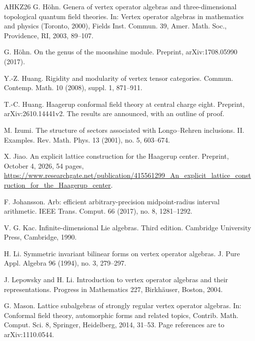 \documentclass[leqno]{article}
\numberwithin{equation}{section}
\begin{document}
\begin{thebibliography}{AHKZ26}
G. Höhn.
\newblock Genera of vertex operator algebras and three-dimensional topological quantum field theories.
\newblock In: Vertex operator algebras in mathematics and physics (Toronto, 2000), Fields Inst. Commun. 39, Amer. Math. Soc., Providence, RI, 2003, 89--107.

G. Höhn.
\newblock On the genus of the moonshine module.
\newblock Preprint, arXiv:1708.05990 (2017).

Y.-Z. Huang.
\newblock Rigidity and modularity of vertex tensor categories.
\newblock Commun. Contemp. Math. 10 (2008), suppl. 1, 871--911.

T.-C. Huang.
\newblock Haagerup conformal field theory at central charge eight.
\newblock Preprint, arXiv:2610.14441v2. The results are announced, with an outline of proof.

M. Izumi.
\newblock The structure of sectors associated with Longo--Rehren inclusions. II. Examples.
\newblock Rev. Math. Phys. 13 (2001), no. 5, 603--674.

X. Jiao.
\newblock An explicit lattice construction for the Haagerup center.
\newblock Preprint, October 4, 2026, 54 pages, \url{https://www.researchgate.net/publication/415561299_An_explicit_lattice_construction_for_the_Haagerup_center}.

F. Johansson.
\newblock Arb: efficient arbitrary-precision midpoint-radius interval arithmetic.
\newblock IEEE Trans. Comput. 66 (2017), no. 8, 1281--1292.

V. G. Kac.
\newblock Infinite-dimensional Lie algebras. Third edition.
\newblock Cambridge University Press, Cambridge, 1990.

H. Li.
\newblock Symmetric invariant bilinear forms on vertex operator algebras.
\newblock J. Pure Appl. Algebra 96 (1994), no. 3, 279--297.

J. Lepowsky and H. Li.
\newblock Introduction to vertex operator algebras and their representations.
\newblock Progress in Mathematics 227, Birkhäuser, Boston, 2004.

G. Mason.
\newblock Lattice subalgebras of strongly regular vertex operator algebras.
\newblock In: Conformal field theory, automorphic forms and related topics, Contrib. Math. Comput. Sci. 8, Springer, Heidelberg, 2014, 31--53. Page references are to arXiv:1110.0544.


\end{thebibliography}
\end{document}
